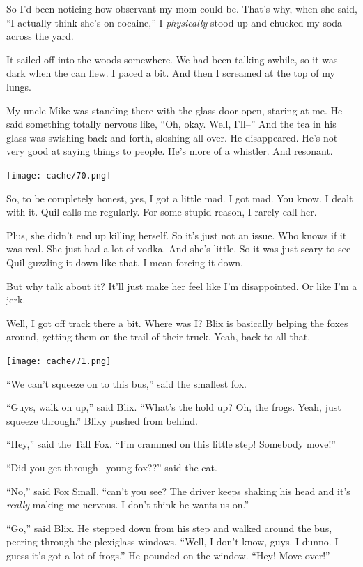 \documentclass[12pt,twoside]{report}
\begin{document}
So I'd been noticing how observant my mom could be.  That's why, when
she said, ``I actually think she's on cocaine,'' I {\em physically}
stood up and chucked my soda across the yard.

It sailed off into the woods somewhere.  We had been talking awhile,
so it was dark when the can flew. I paced a bit.  And then I screamed
at the top of my lungs.

My uncle Mike was standing there with the glass door open, staring at
me.  He said something totally nervous like, ``Oh, okay.  Well,
I'll--'' And the tea in his glass was swishing back and forth,
sloshing all over.  He disappeared.  He's not very good at saying
things to people.  He's more of a whistler.  And resonant.

	\texttt{[image: cache/70.png]}

So, to be completely honest, yes, I got a little mad.  I got mad.  You
know.  I dealt with it. Quil calls me regularly.  For some stupid
reason, I rarely call her.

Plus, she didn't end up killing herself.  So it's just not an issue.
Who knows if it was real. She just had a lot of vodka.  And she's
little.  So it was just scary to see Quil guzzling it down like
that. I mean forcing it down.

But why talk about it?  It'll just make her feel like I'm
disappointed.  Or like I'm a jerk.

Well, I got off track there a bit.  Where was I?  Blix is basically
helping the foxes around, getting them on the trail of their truck.
Yeah, back to all that.

	\texttt{[image: cache/71.png]}

``We can't squeeze on to this bus,'' said the smallest fox.

``Guys, walk on up,'' said Blix.  ``What's the hold up?  Oh, the
        frogs.  Yeah, just squeeze through.'' Blixy pushed from
        behind.

``Hey,'' said the Tall Fox.  ``I'm crammed on this little step!
        Somebody move!''

``Did you get through-- young fox??'' said the cat.

``No,'' said Fox Small, ``can't you see?  The driver keeps shaking his
        head and it's {\em really} making me nervous.  I don't think
        he wants us on.''

``Go,'' said Blix.  He stepped down from his step and walked around
        the bus, peering through the plexiglass windows.  ``Well, I
        don't know, guys.  I dunno.  I guess it's got a lot of
        frogs.''  He pounded on the window.  ``Hey!  Move over!''
\end{document}
